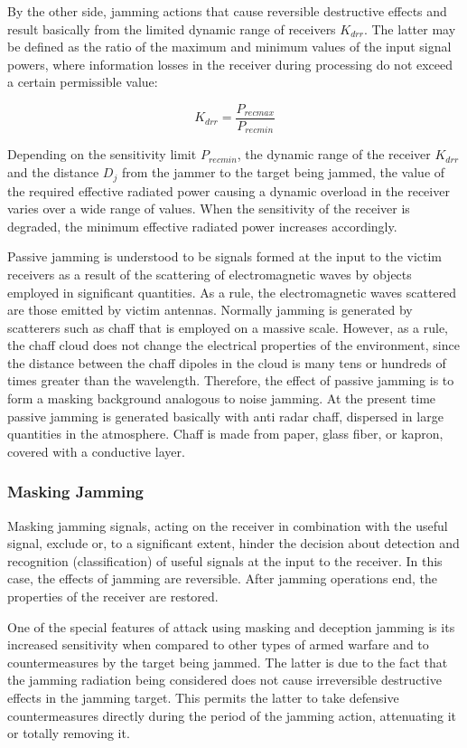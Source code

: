 \documentclass[english,purist]{ist-report}
\begin{document}
By the other side, jamming actions that cause reversible destructive effects and result basically from the limited dynamic range of receivers $K_{drr}$. The latter may be defined as the ratio of the maximum and minimum values of the input signal powers, where information losses in the receiver during processing do not exceed a certain permissible value:

\begin{equation*}
K_{drr}= \frac{P_{rec max}}{P_{rec min}}    
\end{equation*}

Depending on the sensitivity limit $P_{rec min}$, the dynamic range of the receiver $K_{drr}$ and the distance $D_j$ from the jammer to the target being jammed, the value of the required effective radiated power causing a dynamic overload in the receiver varies over a wide range of values. When the sensitivity of the receiver is degraded, the minimum effective radiated power increases accordingly.

Passive jamming is understood to be signals formed at the input to the
victim receivers as a result of the scattering of electromagnetic waves by objects employed in significant quantities. As a rule, the electromagnetic waves scattered are those emitted by victim antennas.
Normally jamming is generated by scatterers such as chaff that is
employed on a massive scale. However, as a rule, the chaff cloud does not change the electrical properties of the environment, since the distance between the chaff dipoles in the cloud is many tens or hundreds of times greater than the wavelength.
Therefore, the effect of passive jamming is to form a masking background analogous to noise jamming. At the present time passive jamming is generated basically with anti radar chaff, dispersed in large quantities in the atmosphere.
Chaff is made from paper, glass fiber, or kapron, covered with a
conductive layer.


\subsubsection{Masking Jamming}
Masking jamming signals, acting on the receiver in combination with
the useful signal, exclude or, to a significant extent, hinder the decision about detection and recognition (classification) of useful signals at the input to the receiver. In this case, the effects of jamming are reversible. After jamming operations end, the properties of the receiver are restored. 

One of the special features of attack using masking and deception
jamming is its increased sensitivity when compared to other types of armed warfare and to countermeasures by the target being jammed. The latter is due to the fact that the jamming radiation being considered does not cause irreversible destructive effects in the jamming target. This permits the latter to take defensive countermeasures directly during the period of the jamming action, attenuating it or totally removing it. 
\end{document}

